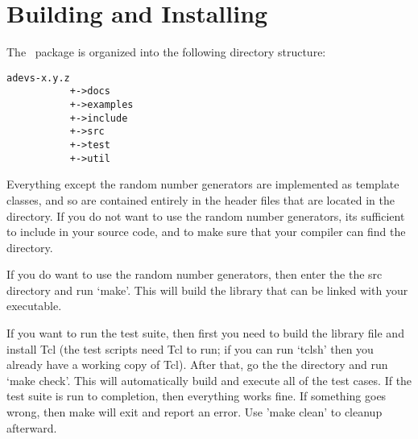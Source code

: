 \chapter{Building and Installing}
The \adevs\ package is organized into the following directory structure:
\begin{verbatim}
adevs-x.y.z
           +->docs
           +->examples
           +->include
           +->src
           +->test
           +->util
\end{verbatim}
Everything except the random number generators are implemented as template classes, and so are contained entirely in the header files that are located in the  directory. If you do not want to use the random number generators, its sufficient to include  in your source code, and to make sure that your compiler can find the  directory. 

If you do want to use the random number generators, then enter the the src directory and run `make'.  This will build the library  that can be linked with your executable. 

If you want to run the test suite, then first you need to build the library file and install Tcl (the test scripts need Tcl to run; if you can run `tclsh' then you already have a working copy of Tcl). After that, go the the  directory and run `make check'. This will automatically build and execute all of the test cases. If the test suite is run to completion, then everything works fine. If something goes wrong, then make will exit and report an error. Use 'make clean' to cleanup afterward.
